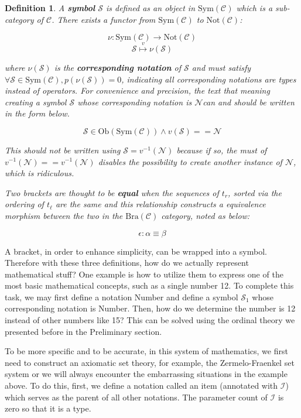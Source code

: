 \documentclass{article}
\newtheorem{definition}{Definition}	%
\numberwithin{theorem}{section}	%
\numberwithin{axiom}{section}	%
\numberwithin{definition}{section}	%
\begin{document}
\begin{definition}
	A \textbf{ symbol} \(\mathcal{S}\) is defined as an object in \(\text{Sym}(\mathcal{C})\) which is a sub-category of \(\mathcal{C}\). There exists a functor from \(\text{Sym}(\mathcal{C})\) to \(\text{Not}(\mathcal{C})\):
	
	\[\nu :\text{Sym}(\mathcal{C})\to \text{Not}(\mathcal{C})\]
	\[\mathcal{S}\overset{\mathit{v}}{\mapsto }\nu (\mathcal{S})\]
	
	\noindent where \(\nu (\mathcal{S})\) is the \textbf{ corresponding notation} of \(\mathcal{S}\) and must satisfy \(\forall \mathcal{S}\in \text{Sym}(\mathcal{C}),\mathit{p}(\nu (\mathcal{S}))=0\), indicating all corresponding notations are types instead of operators. For convenience and precision, the text that meaning creating a symbol \(\mathcal{S}\) whose corresponding notation is \(\mathcal{N}\)can and should be written in the form below.
	
	\[\mathcal{S}\in \text{Ob}(\text{Sym}(\mathcal{C}))\land \mathit{v}(\mathcal{S})==\mathcal{N}\]
	
	This should not be written using \(\mathcal{S}=\mathit{v}^{-1}(\mathcal{N})\) because if so, the must of \(\mathit{v}^{-1}(\mathcal{N})==\mathit{v}^{-1}(\mathcal{N})\) disables the possibility to create another instance of \(\mathcal{N}\), which is ridiculous. 
	
	Two brackets are thought to be \textbf{ equal} when the sequences of \(t_{\mathit{r}}\), sorted via the ordering of \(t_{\ell }\) are the same and this relationship constructs a equivalence morphism between the two in the \(\text{Bra}(\mathcal{C})\) category, noted as below:
	
	\[\epsilon :\alpha \equiv \beta\]
\end{definition}

A bracket, in order to enhance simplicity, can be wrapped into a symbol. Therefore with these three definitions, how do we actually represent mathematical stuff? One example is how to utilize them to express one of the most basic mathematical concepts, such as a single number 12. To complete this task, we may first define a notation Number and define a symbol \(\mathcal{S}_1\) whose corresponding notation is Number. Then, how do we determine the number is 12 instead of other numbers like 15? This can be solved using the ordinal theory we presented before in the Preliminary section.

To be more specific and to be accurate, in this system of mathematics, we first need to construct an axiomatic set theory, for example, the Zermelo-Fraenkel set system or we will always encounter the embarrassing situations in the example above. To do this, first, we define a notation called an item (annotated with \(\mathcal{I}\)) which serves as the parent of all other notations. The parameter count of \(\mathcal{I}\) is zero so that it is a type.
\end{document}
